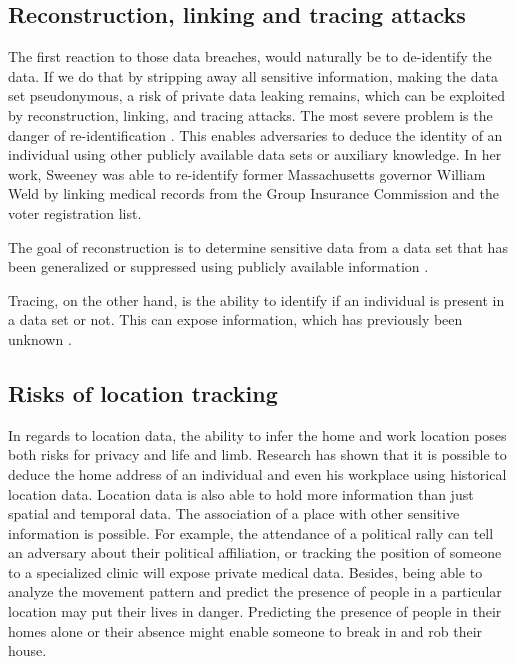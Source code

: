 \subsection{Reconstruction, linking and tracing attacks}
The first reaction to those data breaches, would naturally be to de-identify the data. If we do that by stripping away all sensitive information, making the data set pseudonymous, a risk of private data leaking remains, which can be exploited by reconstruction, linking, and tracing attacks. The most severe problem is the danger of re-identification \cite{reidentification}.
This enables adversaries to deduce the identity of an individual using other publicly available data sets or auxiliary knowledge. 
In her work, Sweeney \cite{DBLP:journals/ijufks/Sweene02} was able to re-identify former Massachusetts governor William Weld by linking medical records from the Group Insurance Commission and the voter registration list.

 The goal of reconstruction is to determine sensitive data from a data set that has been generalized or suppressed using publicly available information \cite{DBLP:journals/fttcs/DworkR14}\cite{exposed}. 
 
Tracing, on the other hand, is the ability to identify if an individual is present in a data set or not. This can expose information, which has previously been unknown \cite{exposed}\cite{dna}.

\subsection{Risks of location tracking}
In regards to location data, the ability to infer the home and work location poses both risks for privacy and life and limb. Research \cite{DBLP:conf/pervasive/Krumm07}\cite{DBLP:journals/corr/abs-1901-00897}\cite{DBLP:conf/pervasive/GolleP09} has shown that it is possible to deduce the home address of an individual and even his workplace using historical location data.
Location data is also able to hold more information than just spatial and temporal data. The association of a place with other sensitive information is possible. For example, the attendance of a political rally can tell an adversary about their political affiliation, or tracking the position of someone to a specialized clinic will expose private medical data.
Besides, being able to analyze the movement pattern and predict the presence of people in a particular location may put their lives in danger. Predicting the presence of people in their homes alone or their absence might enable someone to break in and rob their house.

